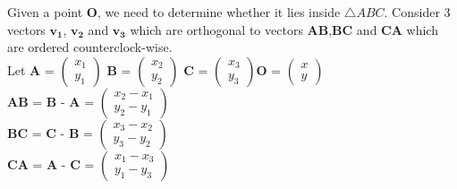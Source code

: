 \documentclass{beamer}
\renewcommand{\vec}[1]{\mathbf{#1}}
\begin{document}
\begin{frame}[fragile]
\begin{columns}
\begin{column}{0.5\textwidth}
Given a point $\vec{O}$, we need to determine whether it lies inside $\triangle ABC$. Consider 3 vectors $\vec{v_1}$, $\vec{v_2}$ and $\vec{v_3}$ which are orthogonal to vectors $\vec{AB}$,$\vec{BC}$ and $\vec{CA}$ which are ordered counterclock-wise.\\
Let $\vec{A}$ = $\begin{pmatrix}x_1\\y_1\end{pmatrix}$ \quad $\vec{B}$ = $\begin{pmatrix}x_2\\y_2\end{pmatrix}$ \quad $\vec{C}$ = $\begin{pmatrix}x_3\\y_3\end{pmatrix}$\quad $\vec{O}$ = $\begin{pmatrix}x\\y\end{pmatrix}$\\
$\vec{AB}$ = $\vec{B}$ - $\vec{A}$ = $\begin{pmatrix}x_2-x_1\\y_2-y_1\end{pmatrix}$\\
$\vec{BC}$ = $\vec{C}$ - $\vec{B}$ = $\begin{pmatrix}x_3-x_2\\y_3-y_2\end{pmatrix}$\\
$\vec{CA}$ = $\vec{A}$ - $\vec{C}$ = $\begin{pmatrix}x_1-x_3\\y_1-y_3\end{pmatrix}$\\
   
\end{column}
\end{columns}
\end{frame}
\end{document}
